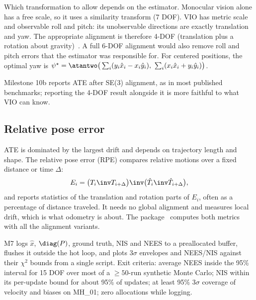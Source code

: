 \begin{keyidea}
Which transformation to allow depends on the estimator. Monocular vision alone has a free scale, so it uses a
similarity transform (7 DOF). VIO has metric scale and observable roll and pitch: its unobservable directions are
exactly translation and yaw. The appropriate alignment is therefore 4-DOF (translation plus a rotation about
gravity)~\cite{zhang2018tutorial}. A full 6-DOF alignment would also remove roll and pitch errors that the
estimator was responsible for. For centered positions, the optimal yaw is
$\psi^\star = \atantwo\big(\sum_i(y_i\hat x_i - x_i\hat y_i),\ \sum_i(x_i\hat x_i + y_i\hat y_i)\big)$.
\end{keyidea}

Milestone 10b reports ATE after SE(3) alignment, as in most published benchmarks; reporting the 4-DOF result
alongside it is more faithful to what VIO can know.

\subsection{Relative pose error}

ATE is dominated by the largest drift and depends on trajectory length and shape. The relative pose error (RPE)
compares relative motions over a fixed distance or time $\Delta$:
\begin{equation}
  E_i = \big(T_{i}\inv T_{i+\Delta}\big)\inv\big(\hat T_i\inv\hat T_{i+\Delta}\big),
\end{equation}
and reports statistics of the translation and rotation parts of $E_i$, often as a percentage of distance traveled. It
needs no global alignment and measures local drift, which is what odometry is about. The 
package~\cite{grupp2017evo} computes both metrics with all the alignment variants.

\begin{projectlink}[Milestone 7]
M7 logs $\hat x$, $\diag(P)$, ground truth, NIS and NEES to a preallocated buffer, flushes it outside the hot loop, and
plots $3\sigma$ envelopes and NEES/NIS against their $\chi^2$ bounds from a single script. Exit criteria: average NEES inside
the 95\% interval for 15 DOF over most of a $\geq50$-run synthetic Monte Carlo; NIS within its per-update bound for about
95\% of updates; at least 95\% $3\sigma$ coverage of velocity and biases on MH\_01; zero allocations while logging.
\end{projectlink}

